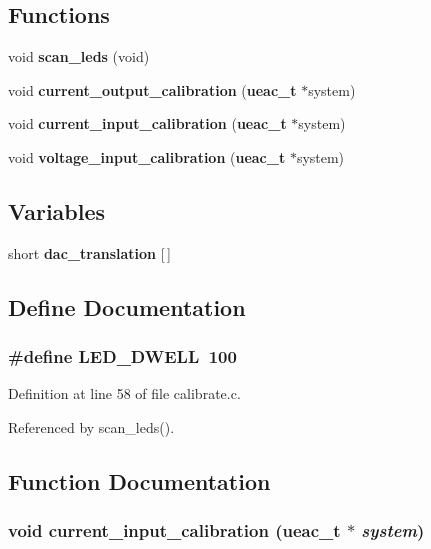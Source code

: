 \subsection*{Functions}
\begin{CompactItemize}
\item 
void {\bf scan\_\-leds} (void)
\item 
void {\bf current\_\-output\_\-calibration} ({\bf ueac\_\-t} $\ast$system)
\item 
void {\bf current\_\-input\_\-calibration} ({\bf ueac\_\-t} $\ast$system)
\item 
void {\bf voltage\_\-input\_\-calibration} ({\bf ueac\_\-t} $\ast$system)
\end{CompactItemize}
\subsection*{Variables}
\begin{CompactItemize}
\item 
short {\bf dac\_\-translation} [$\,$]
\end{CompactItemize}


\subsection{Define Documentation}
\subsubsection{\setlength{\rightskip}{0pt plus 5cm}\#define LED\_\-DWELL~100}\label{calibrate_8c_a0}




Definition at line 58 of file calibrate.c.

Referenced by scan\_\-leds().

\subsection{Function Documentation}
\subsubsection{\setlength{\rightskip}{0pt plus 5cm}void current\_\-input\_\-calibration ({\bf ueac\_\-t} $\ast$ {\em system})}\label{calibrate_8c_a4}




